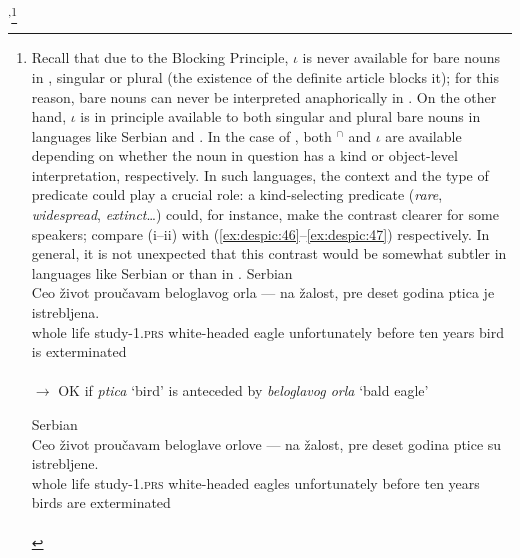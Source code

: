 \documentclass[output=paper,
modfonts
]{langscibook}
\begin{document}
{	}\textsuperscript{,}\footnote{Recall that due to the Blocking Principle, $\iota$ is never available for bare nouns in , singular or plural (the existence of the definite article blocks it); for this reason, bare nouns can never be interpreted anaphorically in . On the other hand, $\iota$ is in principle available to both singular and plural bare nouns in languages like Serbian and . In the case of , both $^\cap$ and $\iota$ are available depending on whether the noun in question has a kind or object-level interpretation, respectively. In such languages, the context and the type of predicate could play a crucial role: a kind-selecting predicate (\textit{rare}, \textit{widespread}, \textit{extinct}\ldots) could, for instance, make the contrast clearer for some speakers; compare (i--ii) with (\ref{ex:despic:46}--\ref{ex:despic:47}) respectively. In general, it is not unexpected that this contrast would be somewhat subtler in languages like Serbian or  than in .   
		\ea \label{ex:despic:n11i}
		\textnormal{Serbian} \\
		\gll Ceo {\v zivot} {prou\v cavam}      beloglavog     orla  {---}   {na \v zalost},         pre     deset godina ptica je  istrebljena. 	 \\
		{whole} {life}    {study-1.\textsc{prs}} {white-headed} {eagle}  {}   {unfortunately} {before} {ten} {years} {bird}  {is} {exterminated} \\
		 \\
		{$\rightarrow$ OK if \textit{ptica} `bird' is anteceded by \textit{beloglavog orla} `bald eagle'}
		\z
		
		\ea  \label{ex:despic:n11ii}
		\textnormal{Serbian} \\
		\gll    Ceo     {\v zivot} {prou\v cavam}     beloglave        orlove --- {na \v zalost},       pre      deset godina ptice  su   istrebljene. 	 \\
		{whole} {life}    {study-1.\textsc{prs}} {white-headed} {eagles}  {}    {unfortunately} {before} {ten}      {years}  {birds}  {are} {exterminated} \\
		  \\ 
		\z
	} 
	
\end{document}
